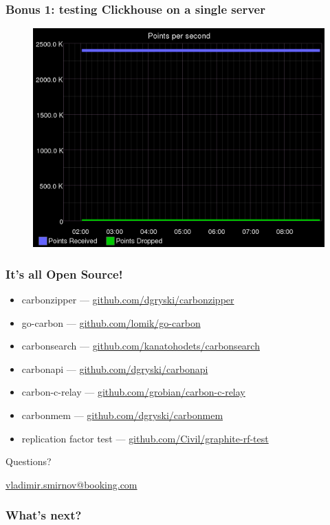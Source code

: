 \documentclass[aspectratio=43, unicode, notheorems, xcolor={dvipsnames}]{beamer}
\begin{document}
\begin{frame}
	\frametitle{Bonus 1: testing Clickhouse on a single server}
	\begin{figure}[h]
		\begin{center}
			\includegraphics[width=0.8\columnwidth]{clickhouse_experiment_single_server}
		\end{center}
	\end{figure}
\end{frame}


\begin{frame}
	\frametitle{It's all Open Source!}
	\Large{
	\begin{itemize}
		\item carbonzipper --- \href{https://github.com/dgryski/carbonzipper}{github.com/dgryski/carbonzipper}
		\item go-carbon --- \href{https://github.com/lomik/go-carbon}{github.com/lomik/go-carbon}
		\item carbonsearch --- \href{https://github.com/kanatohodets/carbonsearch}{github.com/kanatohodets/carbonsearch}
		\item carbonapi --- \href{https://github.com/dgryski/carbonapi}{github.com/dgryski/carbonapi}
		\item carbon-c-relay --- \href{https://github.com/grobian/carbon-c-relay}{github.com/grobian/carbon-c-relay}
		\item carbonmem --- \href{https://github.com/dgryski/carbonmem}{github.com/dgryski/carbonmem}
		\item replication factor test --- \href{https://github.com/Civil/graphite-rf-test}{github.com/Civil/graphite-rf-test}
	\end{itemize}
	}
\end{frame}

\begin{frame}
\begin{block}{}
        \center\LARGE Questions?

	\center\LARGE \href{mailto:vladimir.smirnov@booking.com}{vladimir.smirnov@booking.com}
\end{block}
\end{frame}


\begin{frame}
\frametitle{What's next?}
\begin{block}{}
\end{block}
\end{frame}
\end{document}
